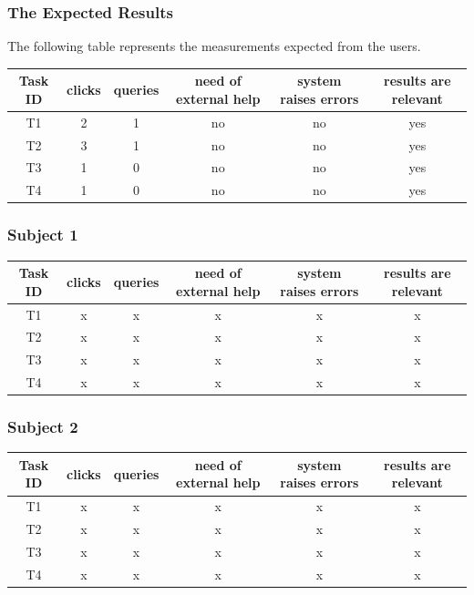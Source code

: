 \documentclass[unicode,9pt,a4paper,oneside,numbers=endperiod,openany]{scrartcl}
\begin{document}
\subsubsection{The Expected Results}

The following table represents the measurements expected from the users.
\newline

\begin{tabular}{c|c|c|c|c|c}
    Task ID & clicks & queries & need of external help & system raises errors & results are relevant \\ \hline
    T1 & 2 & 1 & no & no & yes \\
    T2 & 3 & 1 & no & no & yes \\
    T3 & 1 & 0 & no & no & yes \\
    T4 & 1 & 0 & no & no & yes \\
\end{tabular}

\subsubsection{Subject 1}

\begin{tabular}{c|c|c|c|c|c}
    Task ID & clicks & queries & need of external help & system raises errors & results are relevant \\ \hline
    T1 & x & x & x & x & x \\
    T2 & x & x & x & x & x \\
    T3 & x & x & x & x & x \\
    T4 & x & x & x & x & x \\
\end{tabular}

\subsubsection{Subject 2}

\begin{tabular}{c|c|c|c|c|c}
    Task ID & clicks & queries & need of external help & system raises errors & results are relevant \\ \hline
    T1 & x & x & x & x & x \\
    T2 & x & x & x & x & x \\
    T3 & x & x & x & x & x \\
    T4 & x & x & x & x & x \\
\end{tabular}
\end{document}
